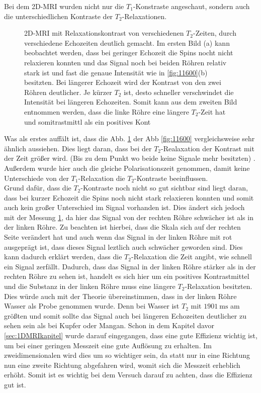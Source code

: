 Bei dem 2D-MRI wurden nicht nur die $T_1$-Konstraste angeschaut, sondern auch die unterschiedlichen Kontraste der $T_2$-Relaxationen. 

    \begin{figure}[H]
        \centering
        {}
        {}
        \caption[2D-MRI mit Relaxationskontrast von verschiedenen $T_2$-Zeiten, durch verschiedene Echozeiten]{2D-MRI mit Relaxationskontrast von verschiedenen $T_2$-Zeiten, durch verschiedene Echozeiten deutlich gemacht. Im ersten Bild (a) kann beobachtet werden, dass bei geringer Echozeit die Spins nocht nicht relaxieren konnten und das Signal noch bei beiden Röhren relativ stark ist und fast die genaue Intensität wie in \ref{fig:11600}(b) besitzten. Bei längerer Echozeit wird der Kontrast von den zwei Röhren deutlicher. Je kürzer $T_2$ ist, desto schneller verschwindet die Intensität bei längeren Echozeiten. Somit kann aus dem zweiten Bild entnommen werden, dass die linke Röhre eine längere $T_2$-Zeit hat und somitrastmittl als ein positives Kont}\label{fig:1250}
    \end{figure}
Was als erstes auffält ist, dass die Abb. \ref{fig:1250} der Abb \ref{fig:11600}  vergleichsweise sehr ähnlich aussiehen. Dies liegt daran, dass bei der $T_2$-Realaxation der Kontrast mit der Zeit größer wird. (Bis zu dem Punkt wo beide keine Signale mehr besitzten) . Außerdem wurde hier auch die gleiche Polarisationszeit genommen, damit keine Unterschiede von der $T_1$-Relaxation die $T_2$-Kontraste beeinflussen. \\
Grund dafür, dass die $T_2$-Kontraste noch nicht so gut sichtbar sind liegt daran, dass bei kurzer Echozeit die Spins noch nicht stark relaxieren konnten und somit auch kein großer Unterschied im Signal vorhanden ist. Dies ändert sich jedoch mit der Messung \ref{fig:1250}, da hier das Signal von der rechten Röhre schwächer ist als in der linken Röhre. Zu beachten ist hierbei, dass die Skala sich auf der rechten Seite verändert hat und auch wenn das Signal in der linken Röhre mit rot ausgeprägt ist, dass dieses Signal leztlich auch schwächer geworden sind. Dies kann dadurch erklärt werden, dass die $T_2$-Relaxation die Zeit angibt, wie schnell ein Signal zerfällt. Dadurch, dass das Signal in der linken Röhre stärker als in der rechten Röhre zu sehen ist, handelt es sich hier um ein positives Kontrastmittel und die Substanz in der linken Röhre muss eine längere $T_2$-Relaxation besitzten.  
Dies würde auch mit der Theorie übereinstimmen, dass in der linken Röhre Wasser als Probe genommen wurde. Denn bei Wasser ist $T_2$ mit  $\SI{1901}{\milli\second}$ am größten und somit sollte das Signal auch bei längeren Echozeiten deutlicher zu sehen sein als bei Kupfer oder Mangan.
Schon in dem Kapitel davor \ref{sec:1DMRIkapitel} wurde darauf eingegangen, dass eine gute Effizienz wichtig ist, um bei einer geringen Messzeit eine gute Auflösung zu erhalten. Im zweidimensionalen wird dies um so wichtiger sein, da statt nur in eine Richtung nun eine zweite Richtung abgefahren wird, womit sich die Messzeit erheblich erhöht. Somit ist es wichtig bei dem Versuch darauf zu achten, dass die Effizienz gut ist.